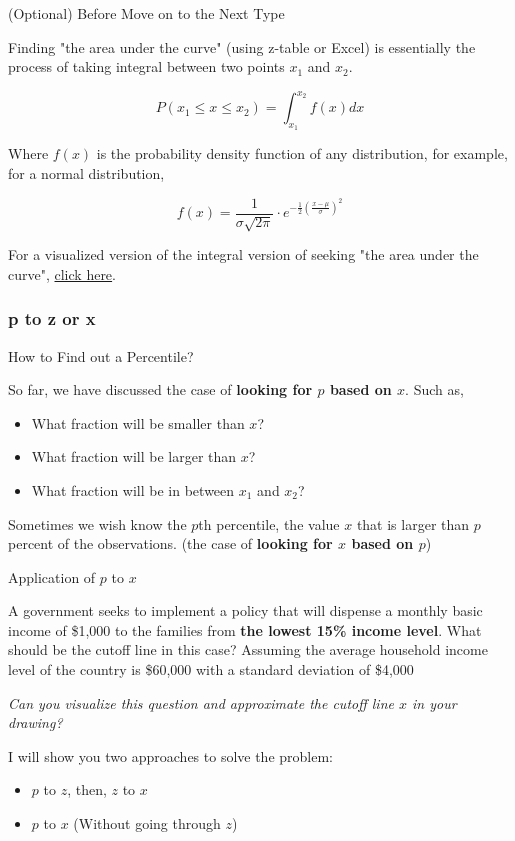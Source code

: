 \documentclass{beamer}
\begin{document}
\begin{frame}{(Optional) Before Move on to the Next Type}

Finding "the area under the curve" (using z-table or Excel) is essentially the process of taking integral between two points $x_1$ and $x_2$.

$$ P(x_1 \leq x \leq x_2) =  \int_{x_1}^{x_2} f(x)dx$$

Where $f(x)$ is the probability density function of any distribution, for example, for a normal distribution, 

$$ f(x) = \frac{1}{\sigma\sqrt{2\pi}} \cdot e^{-\frac{1}{2} \left(   \frac{x-\mu}{\sigma}\right)^2} $$

For a visualized version of the integral version of seeking "the area under the curve", \href{https://www.desmos.com/calculator/1ijzmmngxb}{click here}.

\end{frame}


\subsubsection{p to z or x}


\begin{frame}{How to Find out a Percentile?}

So far, we have discussed the case of \textbf{looking for $p$ based on $x$}. Such as, 
\begin{itemize}
\item What fraction will be smaller than $x$?
\item What fraction will be larger than $x$? 
\item What fraction will be in between $x_1$ and $x_2$?
\end{itemize}

Sometimes we wish know the $p$th percentile, the value $x$ that is larger than $p$ percent of the observations. (the case of \textbf{looking for $x$ based on $p$})


\end{frame}


\begin{frame}{Application of $p$ to $x$}

A government seeks to implement a policy that will dispense a monthly basic income of \$1,000 to the families from \textbf{the lowest 15\% income level}. What should be the cutoff line in this case? Assuming the average household income level of the country is \$60,000 with a standard deviation of \$4,000 

\vspace{0.3 cm}

\textit{Can you visualize this question and approximate the cutoff line $x$ in your drawing? 
}
\vspace{0.3 cm}

I will show you two approaches to solve the problem: 
\begin{itemize}
\item $p$ to $z$, then, $z$ to $x$
\item $p$ to $x$ (Without going through $z$) 
\end{itemize}

\end{frame}
\end{document}
